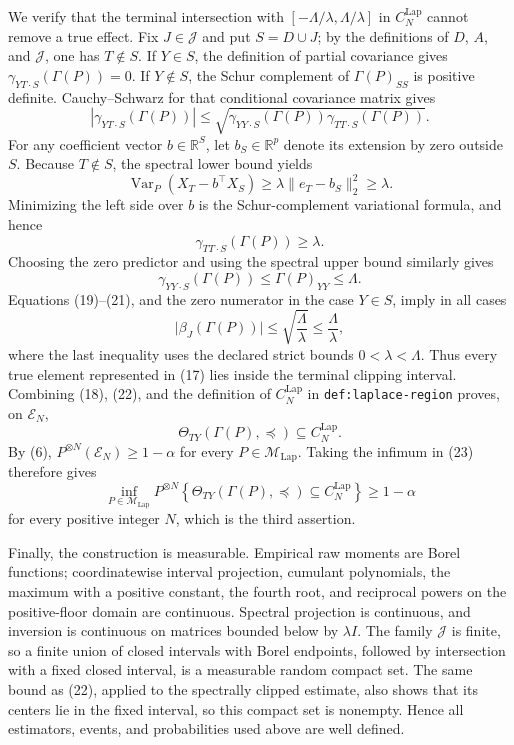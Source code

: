 We verify that the terminal intersection with
\([-\Lambda/\lambda,\Lambda/\lambda]\) in
\(C_N^{\mathrm{Lap}}\) cannot remove a true effect.  Fix
\(J\in\mathcal J\) and put \(S=D\cup J\); by the definitions of \(D\),
\(A\), and \(\mathcal J\), one has \(T\notin S\).  If \(Y\in S\), the
definition of partial covariance gives
\(\gamma_{YT\mathbin{\cdot}S}(\Gamma(P))=0\).  If \(Y\notin S\), the
Schur complement of \(\Gamma(P)_{SS}\) is positive definite.  Cauchy--Schwarz
for that conditional covariance matrix gives
\[
 \left\lvert\gamma_{YT\mathbin{\cdot}S}(\Gamma(P))\right\rvert
 \leq
 \sqrt{
 \gamma_{YY\mathbin{\cdot}S}(\Gamma(P))
 \gamma_{TT\mathbin{\cdot}S}(\Gamma(P))}.
                                                               \tag{19}
\]
For any coefficient vector \(b\in\mathbb R^S\), let \(b_S\in\mathbb R^p\)
denote its extension by zero outside \(S\).  Because \(T\notin S\), the
spectral lower bound yields
\[
 \operatorname{Var}_P\!\left(X_T-b^\top X_S\right)
 \geq\lambda\lVert e_T-b_S\rVert_2^2
 \geq\lambda.
\]
Minimizing the left side over \(b\) is the Schur-complement variational
formula, and hence
\[
 \gamma_{TT\mathbin{\cdot}S}(\Gamma(P))\geq\lambda.     \tag{20}
\]
Choosing the zero predictor and using the spectral upper bound similarly
gives
\[
 \gamma_{YY\mathbin{\cdot}S}(\Gamma(P))
 \leq\Gamma(P)_{YY}\leq\Lambda.                         \tag{21}
\]
Equations (19)--(21), and the zero numerator in the case \(Y\in S\), imply
in all cases
\[
 \lvert\beta_J(\Gamma(P))\rvert
 \leq\sqrt{\frac{\Lambda}{\lambda}}
 \leq\frac{\Lambda}{\lambda},                          \tag{22}
\]
where the last inequality uses the declared strict bounds
\(0<\lambda<\Lambda\).  Thus every true element represented in (17) lies
inside the terminal clipping interval.  Combining (18), (22), and the
definition of \(C_N^{\mathrm{Lap}}\) in
\texttt{def:laplace-region} proves, on \(\mathcal E_N\),
\[
 \Theta_{TY}(\Gamma(P),\preceq)\subseteq C_N^{\mathrm{Lap}}. \tag{23}
\]
By (6), \(P^{\otimes N}(\mathcal E_N)\geq1-\alpha\) for every
\(P\in\mathcal M_{\mathrm{Lap}}\).  Taking the infimum in (23) therefore
gives
\[
 \inf_{P\in\mathcal M_{\mathrm{Lap}}}
 P^{\otimes N}\!\left\{
 \Theta_{TY}(\Gamma(P),\preceq)\subseteq C_N^{\mathrm{Lap}}
 \right\}\geq1-\alpha                                  \tag{24}
\]
for every positive integer \(N\), which is the third assertion.

Finally, the construction is measurable.  Empirical raw moments are Borel
functions; coordinatewise interval projection, cumulant polynomials, the
maximum with a positive constant, the fourth root, and reciprocal powers on
the positive-floor domain are continuous.  Spectral projection is
continuous, and inversion is continuous on matrices bounded below by
\(\lambda I\).  The family \(\mathcal J\) is finite, so a finite union of
closed intervals with Borel endpoints, followed by intersection with a
fixed closed interval, is a measurable random compact set.  The same bound
as (22), applied to the spectrally clipped estimate, also shows that its
centers lie in the fixed interval, so this compact set is nonempty.  Hence
all estimators, events, and probabilities used above are well defined.
